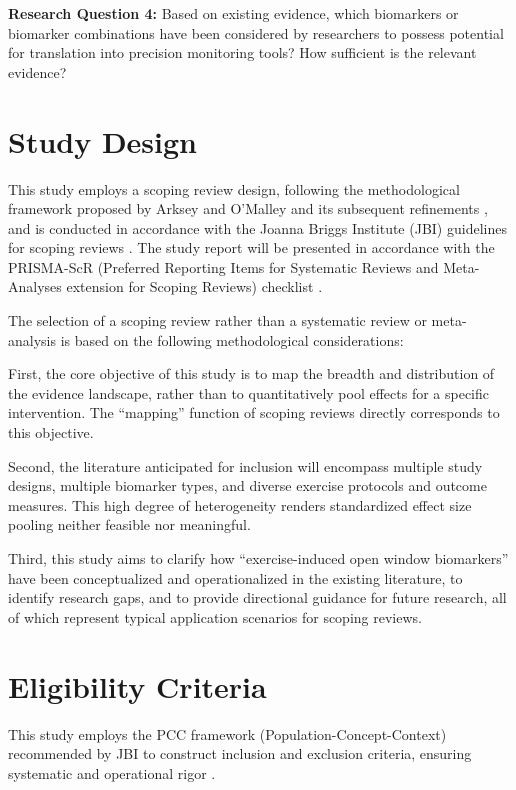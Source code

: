 \documentclass[12pt,a4paper]{article}
\begin{document}
\textbf{Research Question 4:} Based on existing evidence, which biomarkers or biomarker combinations have been considered by researchers to possess potential for translation into precision monitoring tools? How sufficient is the relevant evidence?

\section{Study Design}

This study employs a scoping review design, following the methodological framework proposed by Arksey and O'Malley \citep{arksey2005scoping} and its subsequent refinements \citep{levac2010scoping}, and is conducted in accordance with the Joanna Briggs Institute (JBI) guidelines for scoping reviews \citep{peters2020jbi}. The study report will be presented in accordance with the PRISMA-ScR (Preferred Reporting Items for Systematic Reviews and Meta-Analyses extension for Scoping Reviews) checklist \citep{tricco2018prisma}.

The selection of a scoping review rather than a systematic review or meta-analysis is based on the following methodological considerations:

First, the core objective of this study is to map the breadth and distribution of the evidence landscape, rather than to quantitatively pool effects for a specific intervention. The ``mapping'' function of scoping reviews directly corresponds to this objective.

Second, the literature anticipated for inclusion will encompass multiple study designs, multiple biomarker types, and diverse exercise protocols and outcome measures. This high degree of heterogeneity renders standardized effect size pooling neither feasible nor meaningful.

Third, this study aims to clarify how ``exercise-induced open window biomarkers'' have been conceptualized and operationalized in the existing literature, to identify research gaps, and to provide directional guidance for future research, all of which represent typical application scenarios for scoping reviews.

\section{Eligibility Criteria}

This study employs the PCC framework (Population-Concept-Context) recommended by JBI to construct inclusion and exclusion criteria, ensuring systematic and operational rigor \citep{peters2020jbi}.
\end{document}
